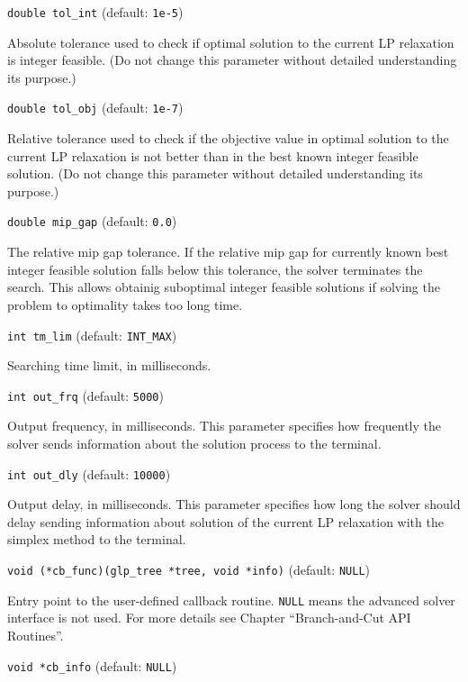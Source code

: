 {\tt double tol\_int} (default: {\tt 1e-5})

Absolute tolerance used to check if optimal solution to the current LP
relaxation is integer feasible. (Do not change this parameter without
detailed understanding its purpose.)

\bigskip

{\tt double tol\_obj} (default: {\tt 1e-7})

Relative tolerance used to check if the objective value in optimal
solution to the current LP relaxation is not better than in the best
known integer feasible solution. (Do not change this parameter without
detailed understanding its purpose.)

\bigskip

{\tt double mip\_gap} (default: {\tt 0.0})

The relative mip gap tolerance. If the relative mip gap for currently
known best integer feasible solution falls below this tolerance, the
solver terminates the search. This allows obtainig suboptimal integer
feasible solutions if solving the problem to optimality takes too long
time.

\bigskip

{\tt int tm\_lim} (default: {\tt INT\_MAX})

Searching time limit, in milliseconds.

\bigskip

{\tt int out\_frq} (default: {\tt 5000})

Output frequency, in milliseconds. This parameter specifies how
frequently the solver sends information about the solution process to
the terminal.

\bigskip

{\tt int out\_dly} (default: {\tt 10000})

Output delay, in milliseconds. This parameter specifies how long the
solver should delay sending information about solution of the current
LP relaxation with the simplex method to the terminal.

\bigskip

{\tt void (*cb\_func)(glp\_tree *tree, void *info)}
(default: {\tt NULL})

Entry point to the user-defined callback routine. \verb|NULL| means
the advanced solver interface is not used. For more details see Chapter
``Branch-and-Cut API Routines''.

\bigskip

{\tt void *cb\_info} (default: {\tt NULL})

